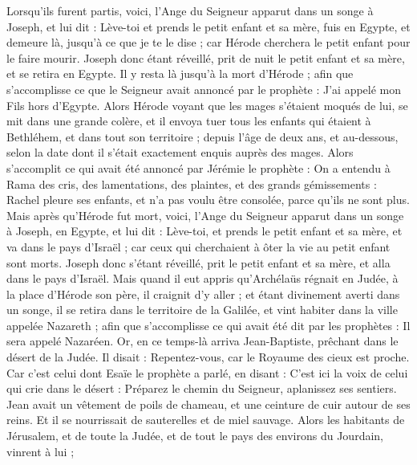\begin{multicols}{2}
Lorsqu’ils furent partis, voici, l’Ange du Seigneur apparut dans un songe à Joseph, et lui dit : Lève-toi et prends le petit enfant et sa mère, fuis en Egypte, et demeure là, jusqu'à ce que je te le dise ; car Hérode cherchera le petit enfant pour le faire mourir.
Joseph donc étant réveillé, prit de nuit le petit enfant et sa mère, et se retira en Egypte.
Il y resta là jusqu’à la mort d'Hérode ; afin que s’accomplisse ce que le Seigneur avait annoncé par le prophète : J'ai appelé mon Fils hors d'Egypte.
Alors Hérode voyant que les mages s'étaient moqués de lui, se mit dans une grande colère, et il envoya tuer tous les enfants qui étaient à Bethléhem, et dans tout son territoire ; depuis l'âge de deux ans, et au-dessous, selon la date dont il s'était exactement enquis auprès des mages.
Alors s’accomplit ce qui avait été annoncé par Jérémie le prophète :
On a entendu à Rama des cris, des lamentations, des plaintes, et des grands gémissements : Rachel pleure ses enfants, et n’a pas voulu être consolée, parce qu’ils ne sont plus.
Mais après qu'Hérode fut mort, voici, l'Ange du Seigneur apparut dans un songe à Joseph, en Egypte,
et lui dit : Lève-toi, et prends le petit enfant et sa mère, et va dans le pays d'Israël ; car ceux qui cherchaient à ôter la vie au petit enfant sont morts.
Joseph donc s'étant réveillé, prit le petit enfant et sa mère, et alla dans le pays d'Israël.
Mais quand il eut appris qu'Archélaüs régnait en Judée, à la place d'Hérode son père, il craignit d'y aller ; et étant divinement averti dans un songe, il se retira dans le territoire de la Galilée,
et vint habiter dans la ville appelée Nazareth ; afin que s’accomplisse ce qui avait été dit par les prophètes : Il sera appelé Nazaréen.
\VerseOne{}Or, en ce temps-là arriva Jean-Baptiste, prêchant dans le désert de la Judée.
Il disait : Repentez-vous, car le Royaume des cieux est proche.
Car c'est celui dont Esaïe le prophète a parlé, en disant : C’est ici la voix de celui qui crie dans le désert : Préparez le chemin du Seigneur, aplanissez ses sentiers.
Jean avait un vêtement de poils de chameau, et une ceinture de cuir autour de ses reins. Et il se nourrissait de sauterelles et de miel sauvage.
Alors les habitants de Jérusalem, et de toute la Judée, et de tout le pays des environs du Jourdain, vinrent à lui ;

\end{multicols}
